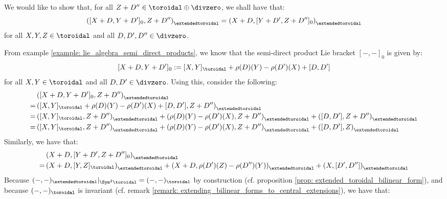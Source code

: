 We would like to show that, for all $Z + D'' \in \toroidal \oplus \divzero$, we shall have that:
                    $$\left( [X + D, Y + D']_0, Z + D'' \right)_{\extendedtoroidal} = \left( X + D, [Y + D', Z + D'']_0 \right)_{\extendedtoroidal}$$
                for all $X, Y, Z \in \toroidal$ and all $D, D', D'' \in \divzero$.
                
                From example \ref{example: lie_algebra_semi_direct_products}, we know that the semi-direct product Lie bracket $[-, -]_0$ is given by:
                    $$[X + D, Y + D']_0 := [X, Y]_{\toroidal} + \rho(D)(Y) - \rho(D')(X) + [D, D']$$
                for all $X, Y \in \toroidal$ and all $D, D' \in \divzero$. Using this, consider the following:
                    $$
                        \begin{aligned}
                            & \left( [X + D, Y + D']_0, Z + D'' \right)_{\extendedtoroidal}
                            \\
                            = & \left( [X, Y]_{\toroidal} + \rho(D)(Y) - \rho(D')(X) + [D, D'], Z + D'' \right)_{\extendedtoroidal}
                            \\
                            = & \left( [X, Y]_{\toroidal}, Z + D'' \right)_{\extendedtoroidal} + \left(\rho(D)(Y) - \rho(D')(X), Z + D'' \right)_{\extendedtoroidal} + \left( [D, D'], Z + D'' \right)_{\extendedtoroidal}
                            \\
                            = & \left( [X, Y]_{\toroidal}, Z + D'' \right)_{\extendedtoroidal} + \left(\rho(D)(Y) - \rho(D')(X), Z + D'' \right)_{\extendedtoroidal} + \left( [D, D'], Z \right)_{\extendedtoroidal}
                        \end{aligned}
                    $$
                Similarly, we have that:
                    $$
                        \begin{aligned}
                            & \left( X + D, [Y + D', Z + D'']_0 \right)_{\extendedtoroidal}
                            \\
                            = & \left( X + D, [Y, Z]_{\toroidal} \right)_{\extendedtoroidal} + \left( X + D, \rho(D')(Z) - \rho(D'')(Y) \right)_{\extendedtoroidal} + \left(X, [D', D'']\right)_{\extendedtoroidal}
                        \end{aligned}
                    $$
                Because $(-, -)_{\extendedtoroidal}|_{\Sym^2 \toroidal} = (-, -)_{\toroidal}$ by construction (cf. proposition \ref{prop: extended_toroidal_bilinear_form}), and because $(-, -)_{\toroidal}$ is invariant (cf. remark \ref{remark: extending_bilinear_forms_to_central_extensions}), we have that:
